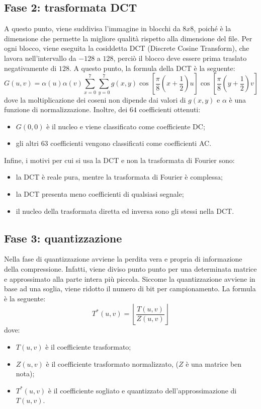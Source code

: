 \subsection{Fase 2: trasformata DCT}
A questo punto, viene suddivisa l'immagine in blocchi da $8x8$, poiché è la dimensione che permette la migliore qualità rispetto alla dimensione del file.
Per ogni blocco, viene eseguita la cosiddetta DCT (Discrete Cosine Transform), che lavora nell'intervallo da $-128$ a $128$, perciò il blocco deve essere
prima traslato negativamente di $128$. A questo punto, la formula della DCT è la seguente:
\begin{equation*}
    G(u,v)=\alpha(u)\alpha(v)\sum_{x=0}^{7}\sum_{y=0}^{7}g(x,y)\cos{\left[\frac{\pi}{8}\left(x+\frac{1}{2}\right)u\right]}\cos{\left[\frac{\pi}{8}\left(y+\frac{1}{2}\right)v\right]}
\end{equation*}
dove la moltiplicazione dei coseni non dipende dai valori di $g(x,y)$ e $\alpha$ è una funzione di normalizzazione.
Inoltre, dei $64$ coefficienti ottenuti:
\begin{itemize}
    \item $G(0,0)$ è il nucleo e viene classificato come coefficiente DC;
    \item gli altri $63$ coefficienti vengono classificati come coefficienti AC.
\end{itemize}
Infine, i motivi per cui si usa la DCT e non la trasformata di Fourier sono:
\begin{itemize}
    \item la DCT è reale pura, mentre la trasformata di Fourier è complessa;
    \item la DCT presenta meno coefficienti di qualsiasi segnale;
    \item il nucleo della trasformata diretta ed inversa sono gli stessi nella DCT.
\end{itemize}
\subsection{Fase 3: quantizzazione}
Nella fase di quantizzazione avviene la perdita vera e propria di informazione della compressione. Infatti, viene diviso punto punto per una determinata
matrice e approssimato alla parte intera più piccola. Siccome la quantizzazione avviene in base ad una soglia, viene ridotto il numero di bit per
campionamento. La formula è la seguente:
\begin{equation*}
    T^{*}(u,v)= \left\lfloor \frac{T(u,v)}{Z(u,v)} \right\rfloor
\end{equation*}
dove:
\begin{itemize}
    \item $T(u,v)$ è il coefficiente trasformato;
    \item $Z(u,v)$ è il coefficiente trasformato normalizzato, ($Z$ è una matrice ben nota);
    \item $T^{*}(u,v)$ è il coefficiente sogliato e quantizzato dell'approssimazione di $T(u,v)$.
\end{itemize}
